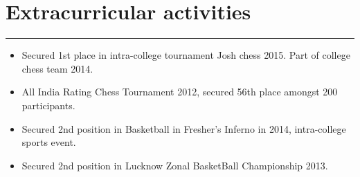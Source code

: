 \documentclass[a4paper]{article}
\begin{document}
\section*{Extracurricular activities}
\hrule
\vspace{3mm}
\begin{itemize}
	\setlength\itemsep{-0.7mm}
	\item Secured 1st place in intra-college tournament Josh chess 2015. Part of college chess team 2014.
	\item All India Rating Chess Tournament 2012, secured 56th place amongst 200 participants.
	\item Secured 2nd position in Basketball in Fresher’s Inferno in 2014, intra-college sports event.
	\item Secured 2nd position in Lucknow Zonal BasketBall Championship 2013.
\end{itemize}
\end{document}
